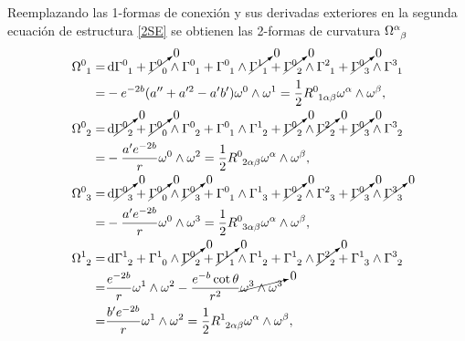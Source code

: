\endgroup
Reemplazando las 1-formas de conexión y sus derivadas exteriores en la segunda ecuación de estructura \eqref{2SE} se obtienen las 2-formas de curvatura $\tensor{\Omega}{^\alpha_\beta}$
\begingroup
\allowdisplaybreaks
\begin{subequations}
    \begin{align}
        \tensor{\Omega}{^0_1}=&\dd{\tensor{\Gamma}{^0_1}}+\cancelto{0}{\tensor{\Gamma}{^0_0}}\wedge\tensor{\Gamma}{^0_1}+\tensor{\Gamma}{^0_1}\wedge\cancelto{0}{\tensor{\Gamma}{^1_1}}+\cancelto{0}{\tensor{\Gamma}{^0_2}}\wedge\tensor{\Gamma}{^2_1}+\cancelto{0}{\tensor{\Gamma}{^0_3}}\wedge\tensor{\Gamma}{^3_1} \nonumber \\
        =& -e^{-2b}(a^{\prime\prime}+a^{\prime 2}-a^\prime b^\prime)\omega^0\wedge\omega^1 = \frac{1}{2}\tensor{R}{^0_1_\alpha_\beta}\omega^\alpha\wedge\omega^\beta, \\
        \tensor{\Omega}{^0_2}=&\dd{\cancelto{0}{\tensor{\Gamma}{^0_2}}}+\cancelto{0}{\tensor{\Gamma}{^0_0}}\wedge\tensor{\Gamma}{^0_2}+\tensor{\Gamma}{^0_1}\wedge\tensor{\Gamma}{^1_2}+\cancelto{0}{\tensor{\Gamma}{^0_2}}\wedge\cancelto{0}{\tensor{\Gamma}{^2_2}}+\cancelto{0}{\tensor{\Gamma}{^0_3}}\wedge\tensor{\Gamma}{^3_2} \nonumber \\
        =& -\frac{a^\prime e^{-2b}}{r}\omega^0\wedge\omega^2= \frac{1}{2}\tensor{R}{^0_2_\alpha_\beta}\omega^\alpha\wedge\omega^\beta, \\
        \tensor{\Omega}{^0_3}=&\dd{\cancelto{0}{\tensor{\Gamma}{^0_3}}}+\cancelto{0}{\tensor{\Gamma}{^0_0}}\wedge\cancelto{0}{\tensor{\Gamma}{^0_3}}+\tensor{\Gamma}{^0_1}\wedge\tensor{\Gamma}{^1_3}+\cancelto{0}{\tensor{\Gamma}{^0_2}}\wedge\tensor{\Gamma}{^2_3}+\cancelto{0}{\tensor{\Gamma}{^0_3}}\wedge\cancelto{0}{\tensor{\Gamma}{^3_3}} \nonumber \\
        =& -\frac{a^\prime e^{-2b}}{r}\omega^0\wedge\omega^3= \frac{1}{2}\tensor{R}{^0_3_\alpha_\beta}\omega^\alpha\wedge\omega^\beta, \\
        \tensor{\Omega}{^1_2}=&\dd{\tensor{\Gamma}{^1_2}}+\tensor{\Gamma}{^1_0}\wedge\cancelto{0}{\tensor{\Gamma}{^0_2}}+\cancelto{0}{\tensor{\Gamma}{^1_1}}\wedge\tensor{\Gamma}{^1_2}+\tensor{\Gamma}{^1_2}\wedge\cancelto{0}{\tensor{\Gamma}{^2_2}}+\tensor{\Gamma}{^1_3}\wedge\tensor{\Gamma}{^3_2} \nonumber \\
        =& \frac{e^{-2b}}{r}\omega^1\wedge\omega^2-\frac{e^{-b}\cot{\theta}}{r^2}\cancelto{0}{\omega^3\wedge\omega^3} \nonumber \\
        =& \frac{b^\prime e^{-2b}}{r}\omega^1\wedge\omega^2 = \frac{1}{2}\tensor{R}{^1_2_\alpha_\beta}\omega^\alpha\wedge\omega^\beta, \\

\end{align}
\end{subequations}
